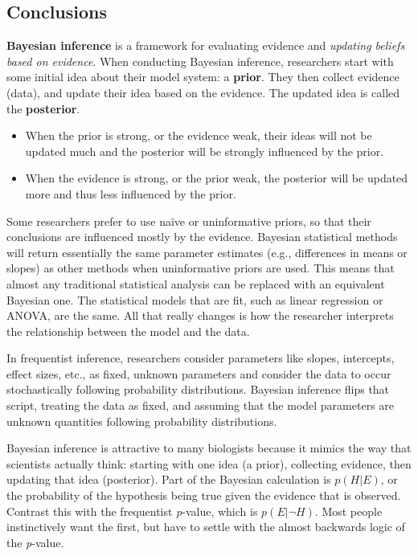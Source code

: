 \documentclass[
  13,
  letterpaper,
]{report}
\providecommand{\tightlist}{%
  \setlength{\itemsep}{0pt}\setlength{\parskip}{0pt}}
\begin{document}
\subsection{Conclusions}\label{sec-intro-bayes-conc}

\textbf{Bayesian inference} is a framework for evaluating evidence and
\emph{updating beliefs based on evidence}. When conducting Bayesian
inference, researchers start with some initial idea about their model
system: a \textbf{prior}. They then collect evidence (data), and update
their idea based on the evidence. The updated idea is called the
\textbf{posterior}.

\begin{itemize}
\tightlist
\item
  When the prior is strong, or the evidence weak, their ideas will not
  be updated much and the posterior will be strongly influenced by the
  prior.
\item
  When the evidence is strong, or the prior weak, the posterior will be
  updated more and thus less influenced by the prior.
\end{itemize}

Some researchers prefer to use naïve or uninformative priors, so that
their conclusions are influenced mostly by the evidence. Bayesian
statistical methods will return essentially the same parameter estimates
(e.g., differences in means or slopes) as other methods when
uninformative priors are used. This means that almost any traditional
statistical analysis can be replaced with an equivalent Bayesian one.
The statistical models that are fit, such as linear regression or ANOVA,
are the same. All that really changes is how the researcher interprets
the relationship between the model and the data.

In frequentist inference, researchers consider parameters like slopes,
intercepts, effect sizes, etc., as fixed, unknown parameters and
consider the data to occur stochastically following probability
distributions. Bayesian inference flips that script, treating the data
as fixed, and assuming that the model parameters are unknown quantities
following probability distributions.

Bayesian inference is attractive to many biologists because it mimics
the way that scientists actually think: starting with one idea (a
prior), collecting evidence, then updating that idea (posterior). Part
of the Bayesian calculation is \(p\left(H|E\right)\), or the probability
of the hypothesis being true given the evidence that is observed.
Contrast this with the frequentist \emph{p}-value, which is
\(p\left(E|\lnot H\right)\). Most people instinctively want the first,
but have to settle with the almost backwards logic of the
\emph{p}-value.
\end{document}

